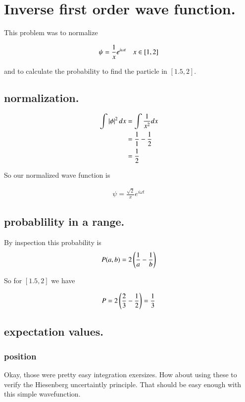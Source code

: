 \documentclass{article}
\begin{document}

\section{ Inverse first order wave function. }

This problem was to normalize 

\begin{align*}
\psi = \frac{1}{x}e^{i\omega t}\quad x \in [1,2]
\end{align*}

and to calculate the probability to find the particle in $[1.5,2]$.

\subsection{ normalization. }

\begin{align*}
\int \left\lvert{\phi}\right\rvert^2 dx 
&= \int \frac{1}{x^2} dx \\
&= \frac{1}{1} -\frac{1}{2} \\
&= \frac{1}{2}
\end{align*}

So our normalized wave function is

\begin{align*}
\psi = \frac{\sqrt{2}}{x}e^{i\omega t}
\end{align*}

\subsection{ probablility in a range. }

By inspection this probability is
\begin{align*}
P(a,b) = {2}\left(\frac{1}{a} - \frac{1}{b}\right)
\end{align*}

So for $[1.5,2]$ we have

\begin{align*}
P = {2}\left(\frac{2}{3} - \inv{2}\right) = \inv{3} %
\end{align*}

\subsection{ expectation values. }

\subsubsection{ position }
Okay, those were pretty easy integration exersizes.  How about using these
to verify the Hiesenberg uncertaintly principle.  That should be easy 
enough with this simple wavefunction.
\end{document}
